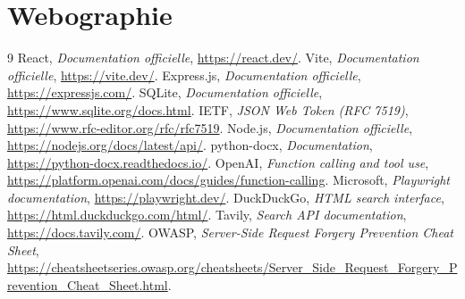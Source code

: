 \documentclass[12pt,a4paper,oneside]{report}
\begin{document}
\chapter*{Webographie}
\begin{thebibliography}{9}
 React, \emph{Documentation officielle}, \url{https://react.dev/}.
 Vite, \emph{Documentation officielle}, \url{https://vite.dev/}.
 Express.js, \emph{Documentation officielle}, \url{https://expressjs.com/}.
 SQLite, \emph{Documentation officielle}, \url{https://www.sqlite.org/docs.html}.
 IETF, \emph{JSON Web Token (RFC 7519)}, \url{https://www.rfc-editor.org/rfc/rfc7519}.
 Node.js, \emph{Documentation officielle}, \url{https://nodejs.org/docs/latest/api/}.
 python-docx, \emph{Documentation}, \url{https://python-docx.readthedocs.io/}.
 OpenAI, \emph{Function calling and tool use}, \url{https://platform.openai.com/docs/guides/function-calling}.
 Microsoft, \emph{Playwright documentation}, \url{https://playwright.dev/}.
 DuckDuckGo, \emph{HTML search interface}, \url{https://html.duckduckgo.com/html/}.
 Tavily, \emph{Search API documentation}, \url{https://docs.tavily.com/}.
 OWASP, \emph{Server-Side Request Forgery Prevention Cheat Sheet}, \url{https://cheatsheetseries.owasp.org/cheatsheets/Server_Side_Request_Forgery_Prevention_Cheat_Sheet.html}.
\end{thebibliography}
\end{document}
